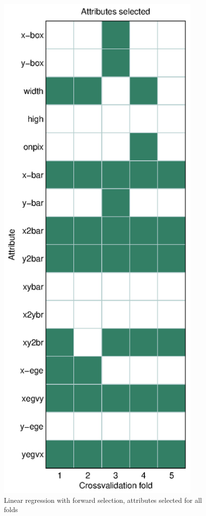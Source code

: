 \begin{figure}[htbp]
\center
\includegraphics[width = 0.9\textwidth]{figures/r1}
\caption{Linear regression with forward selection, attributes selected for all folds}
\label{fig:r1}
\end{figure}

